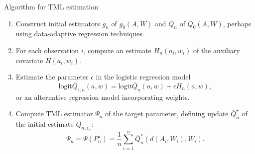 \documentclass{beamer}
\begin{document}

\begin{frame}[c]{Algorithm for TML estimation}

\begin{center}
\begin{enumerate}\label{tmle_algo}
  \itemsep6pt
  \item Construct initial estimators $g_n$ of $g_0(A, W)$ and $Q_n$ of
    $\overline{Q}_0(A, W)$, perhaps using data-adaptive regression techniques.
  \item For each observation $i$, compute an estimate $H_n(a_i, w_i)$ of the
    auxiliary covariate $H(a_i,w_i)$.
  \item Estimate the parameter $\epsilon$ in the logistic regression model
    $$\text{logit}\overline{Q}_{\epsilon, n}(a, w) =
    \text{logit}\overline{Q}_n(a, w) + \epsilon H_n(a, w),$$
    or an alternative regression model incorporating weights.
  \item Compute TML estimator $\Psi_n$ of the target parameter, defining update
    $\overline{Q}_n^{\star}$ of the initial estimate
    $\overline{Q}_{n, \epsilon_n}$:
    \begin{equation*}\label{tmle}
      \Psi_n = \Psi(P_n^{\star}) = \frac{1}{n} \sum_{i = 1}^n
        \overline{Q}_n^{\star}(d(A_i, W_i), W_i).
      \end{equation*}
\end{enumerate}
\end{center}


\end{frame}

\end{document}
